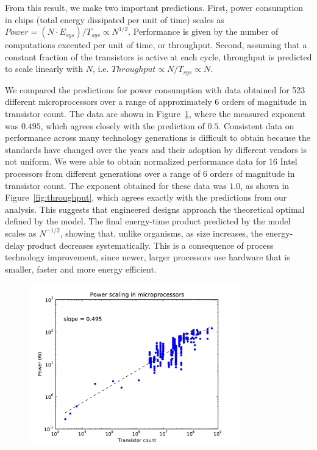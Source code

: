 \documentclass[12pt]{article}
\begin{document}
From this result, we make two important predictions.  First, power consumption
in chips (total energy dissipated per unit of time) scales as $Power = (N\cdot
E_{sys})/T_{sys} \propto N^{1/2}$.  Performance is given by the  number of
computations executed per unit of time, or throughput.  Second, assuming that a
constant fraction of the transistors is active at each cycle, throughput is
predicted to scale linearly with $N$,  i.e.  $Throughput\propto N/T_{sys}
\propto N$.


We compared the predictions for power consumption with data obtained for 523
different microprocessors over a range of approximately 6 orders of magnitude
in transistor count.  The data are shown in Figure~\ref{fig:power}, where the
measured exponent was $0.495$, which agrees closely with the prediction of
$0.5$. Consistent data on performance across many technology generations is
difficult to obtain because the standards have changed over the years and their
adoption by different vendors is not uniform.  We were able to obtain
normalized performance data for 16 Intel processors from different generations
over a range of 6 orders of magnitude in transistor count.  The exponent
obtained for these data was $1.0$, as shown in Figure~\ref{fig:throughput},
which agrees exactly with the predictions from our analysis. This suggests that
engineered designs approach the theoretical optimal defined by the model.  The
final energy-time product predicted by the model scales as $N^{-1/2}$, showing
that, unlike organisms, as size increases, the energy-delay product decreases
systematically. This is a consequence of process technology improvement, since
newer, larger processors use hardware that is smaller, faster and more energy
efficient.


\begin{figure}[!h]
\centering
\includegraphics[height=70mm]{Figures/power_scaling.pdf}
\caption{}
\label{fig:power}
\end{figure}
\end{document}
